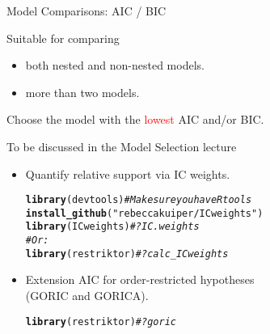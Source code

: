 \documentclass[10pt]{beamer}\usepackage[]{graphicx}\usepackage[]{xcolor}
\makeatletter
\newcommand{\hlsng}[1]{\textcolor[rgb]{0.192,0.494,0.8}{#1}}%
\newcommand{\hlcom}[1]{\textcolor[rgb]{0.678,0.584,0.686}{\textit{#1}}}%
\newcommand{\hldef}[1]{\textcolor[rgb]{0.345,0.345,0.345}{#1}}%
\newcommand{\hlkwd}[1]{\textcolor[rgb]{0.737,0.353,0.396}{\textbf{#1}}}%
\newenvironment{kframe}{%
 \def\at@end@of@kframe{}%
 \ifinner\ifhmode%
  \def\at@end@of@kframe{\end{minipage}}%
  \begin{minipage}{\columnwidth}%
 \fi\fi%
 \def\FrameCommand##1{\hskip\@totalleftmargin \hskip-\fboxsep
 \colorbox{shadecolor}{##1}\hskip-\fboxsep
     \hskip-\linewidth \hskip-\@totalleftmargin \hskip\columnwidth}%
 \MakeFramed {\advance\hsize-\width
   \@totalleftmargin\z@ \linewidth\hsize
   \@setminipage}}%
 {\par\unskip\endMakeFramed%
 \at@end@of@kframe}
\newenvironment{knitrout}{}{} %
\makeatother
\begin{document}
\begin{frame}[fragile]{Model Comparisons: AIC / BIC}

Suitable for comparing
\begin{itemize}
  \item both nested and non-nested models.
  \item more than two models.
\end{itemize}

\vspace*{5mm}

Choose the model with the \textcolor{red}{lowest} AIC and/or BIC.

\vspace*{5mm}

To be discussed in the Model Selection lecture
\begin{itemize}
  \item Quantify relative support via IC weights.\\
\begin{knitrout}
\color{fgcolor}\begin{kframe}
\begin{alltt}
\hlkwd{library}\hldef{(devtools)} \hlcom{# Make sure you have Rtools}
\hlkwd{install_github}\hldef{(}\hlsng{"rebeccakuiper/ICweights"}\hldef{)}
\hlkwd{library}\hldef{(ICweights)} \hlcom{# ?IC.weights}
\hlcom{# Or:}
\hlkwd{library}\hldef{(restriktor)} \hlcom{# ?calc_ICweights}
\end{alltt}
\end{kframe}
\end{knitrout}
  \item Extension AIC for order-restricted hypotheses \\ (GORIC and GORICA).\\
\begin{knitrout}
\color{fgcolor}\begin{kframe}
\begin{alltt}
\hlkwd{library}\hldef{(restriktor)} \hlcom{# ?goric}
\end{alltt}
\end{kframe}
\end{knitrout}
\end{itemize}

\end{frame}
%
\end{document}
